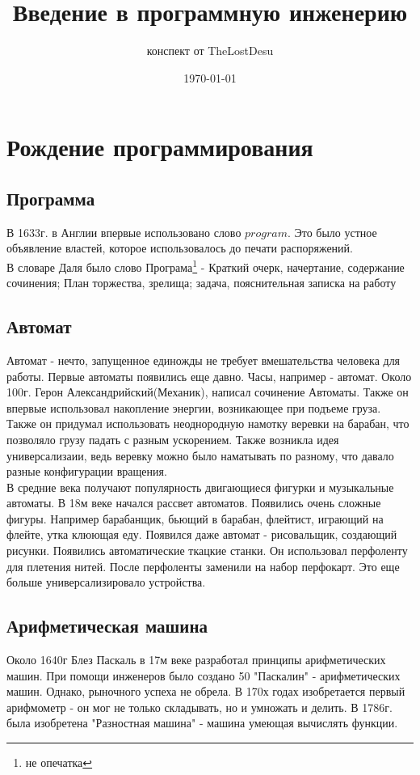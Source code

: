 \documentclass[a4paper,12pt]{article}
\author{конспект от TheLostDesu}
\title{Введение в программную инженерию}
\date{\today}
\begin{document}
\maketitle
\section{Рождение программирования}
\subsection{Программа}
В 1633г. в Англии впервые использовано слово $program$. Это было устное объявление властей, которое использовалось до печати распоряжений. \\
В словаре Даля было слово Програма\footnote{не опечатка} - Краткий очерк, начертание, содержание сочинения; План торжества, зрелища; задача, пояснительная записка на работу\\
\subsection{Автомат}
Автомат - нечто, запущенное единожды не требует вмешательства человека для работы.
Первые автоматы появились еще давно. Часы, например - автомат.
Около 100г. Герон Александрийский(Механик), написал сочинение Автоматы. Также он впервые использовал накопление энергии, возникающее при подъеме груза. Также он придумал использовать неоднородную намотку веревки на барабан, что позволяло грузу падать с разным ускорением. Также возникла идея универсализаии, ведь веревку можно было наматывать по разному, что давало разные конфигурации вращения.\\
В средние века получают популярность двигающиеся фигурки и музыкальные автоматы. 
В 18м веке начался рассвет автоматов. Появились очень сложные фигуры. Например барабанщик, бьющий в барабан, флейтист, играющий на флейте, утка клюющая еду. Появился даже автомат - рисовальщик, создающий рисунки. Появились автоматические ткацкие станки. Он использовал перфоленту для плетения нитей. После перфоленты заменили на набор перфокарт. Это еще больше универсализировало устройства.
\subsection{Арифметическая машина}
Около 1640г Блез Паскаль в 17м веке разработал принципы арифметических машин. При помощи инженеров было создано 50 "Паскалин" - арифметических машин. Однако, рыночного успеха не обрела. В 170х годах изобретается первый арифмометр - он мог не только складывать, но и умножать и делить. В 1786г. была изобретена "Разностная машина" - машина умеющая вычислять функции. 
\end{document}

